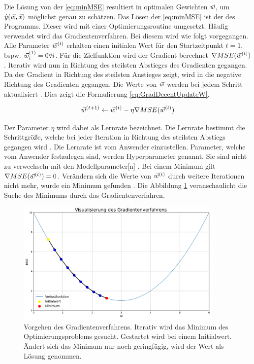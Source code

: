 Die Lösung von der \autoref{eq:minMSE} resultiert in optimalen Gewichten \(\vec{w}\), um \(\hat{y}(\vec{w}, \vec{x})\) möglichst genau zu schätzen. Das Lösen der \autoref{eq:minMSE} ist der  des Programms. Dieser wird mit einer Optimierungsroutine umgesetzt. Häufig verwendet wird das \gls{Gradientenverfahren}. Bei diesem wird wie folgt vorgegangen. Alle Parameter \(\vec{w}^{(t)}\) erhalten einen initialen Wert für den Startzeitpunkt \(t=1\), bspw. \(\vec{w}_i^{(1)}=0 \forall i\). Für die \gls{Zielfunktion} wird der Gradient berechnet \(\nabla MSE(\vec{w}^{(t)})\). Iterativ wird nun in Richtung des steilsten Abstieges des Gradienten gegangen. Da der Gradient in Richtung des steilsten Anstieges zeigt, wird in die negative Richtung des Gradienten gegangen. Die Werte von \(\vec{w}\) werden bei jedem Schritt aktualisiert \cite{Mitchell.1997, Goodfellow.2016, ShalevShwartz.2014}. Dies zeigt die Formulierung \ref{eq:GradDecentUpdateW}.

\begin{equation}
    \label{eq:GradDecentUpdateW}
    \vec{w}^{(t+1)} \leftarrow \vec{w}^{(t)} - \eta\nabla MSE(\vec{w}^{(t)})
\end{equation}

Der Parameter \(\eta\) wird dabei als Lernrate bezeichnet. Die Lernrate bestimmt die Schrittgröße, welche bei jeder Iteration in Richtung des steilsten Abstiegs gegangen wird \cite{Mitchell.1997}. Die Lernrate ist vom Anwender einzustellen. Parameter, welche vom Anwender festzulegen sind, werden \gls{Hyperparameter} genannt. Sie sind nicht zu verwechseln mit den \gls{Modellparameter}[n] \cite{Zheng.2015}. Bei einem Minimum gilt \(\nabla MSE(\vec{w}^{(t)}) = 0\). Verändern sich die Werte von \(\vec{w}^{(t)}\) durch weitere Iterationen nicht mehr, wurde ein Minimum gefunden \cite{Goodfellow.2016, Burkov.2019}. Die Abbildung \ref{fig:GradDecentBsp} veranschaulicht die Suche des Minimums durch das \gls{Gradientenverfahren}.

\begin{figure}[htb]
    \centering
    \includegraphics[width=0.9\textwidth]{img/Plots/Gradientverfahren.png}
    \caption[Vorgehen des Gradientenverfahrens.]{Vorgehen des Gradientenverfahrens. Iterativ wird das Minimum des Optimierungsproblems gesucht. Gestartet wird bei einem Initialwert. Ändert sich das Minimum nur noch geringfügig, wird der Wert als Lösung genommen.}
    \label{fig:GradDecentBsp}
\end{figure}

